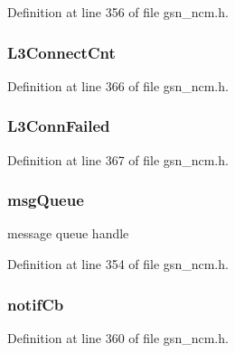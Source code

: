 Definition at line 356 of file gsn\_\-ncm.h.

\hypertarget{a00158_ad41ce430e6b594b9786b7f4445b96ca2}{
\subsubsection[{L3ConnectCnt}]{ {\bf L3ConnectCnt}}}
\label{a00158_ad41ce430e6b594b9786b7f4445b96ca2}


Definition at line 366 of file gsn\_\-ncm.h.

\hypertarget{a00158_afbd204c961f5e9d7f9c19ed7bcedee06}{
\subsubsection[{L3ConnFailed}]{ {\bf L3ConnFailed}}}
\label{a00158_afbd204c961f5e9d7f9c19ed7bcedee06}


Definition at line 367 of file gsn\_\-ncm.h.

\hypertarget{a00158_a3525baeed8d9f795ed0c44437f548da2}{
\subsubsection[{msgQueue}]{ {\bf msgQueue}}}
\label{a00158_a3525baeed8d9f795ed0c44437f548da2}
message queue handle 

Definition at line 354 of file gsn\_\-ncm.h.

\hypertarget{a00158_a8b4a72e6fff7893cb12d41268dcdbdf7}{
\subsubsection[{notifCb}]{ {\bf notifCb}}}
\label{a00158_a8b4a72e6fff7893cb12d41268dcdbdf7}


Definition at line 360 of file gsn\_\-ncm.h.

